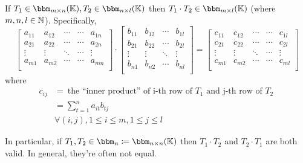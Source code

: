 \begin{definition} 
    If \(T_1 \in \bbm_{m\times n}(\bbk), T_2 \in \bbm_{n\times l}(\bbk)\) then \(T_1 \cdot T_2 \in \bbm_{m\times l}(\bbk)\) (where \(m, n, l \in \mathbb{N}\)). Specifically, \[
        \left[
            \begin{array}{ccccc}
                a_{11} & a_{12} & \cdots & \cdots & a_{1n} \\
                a_{21} & a_{22} & \cdots & \cdots & a_{2n} \\
                \vdots & \vdots & \ddots & \cdots & \vdots \\
                a_{m1} & a_{m2} & \cdots & \cdots & a_{mn} \\
            \end{array}
            \right] \cdot
        \left[
            \begin{array}{cccc}
                b_{11} & b_{12} & \cdots & b_{1l} \\
                b_{21} & b_{22} & \cdots & b_{2l} \\
                \vdots & \vdots & \ddots & \vdots \\
                b_{n1} & b_{n2} & \cdots & b_{nl} \\
            \end{array}
            \right] =
        \left[
            \begin{array}{ccccc}
                c_{11} & c_{12} & \cdots & \cdots & c_{1l} \\
                c_{21} & c_{22} & \cdots & \cdots & c_{2l} \\
                \vdots & \vdots & \ddots & \cdots & \vdots \\
                c_{m1} & c_{m2} & \cdots & \cdots & c_{ml} \\
            \end{array}
            \right]
    \]
    where
    \begin{align*}
        c_{ij} & = \:\text{the ``inner product'' of i-th row of \(T_1\) and j-th row of \(T_2\)}\: \\
               & = \sum_{t=1}^n a_{it}b_{tj}                                                       \\
               & \forall (i, j), 1 \leq i \leq m, 1 \leq j \leq l
    \end{align*}
\end{definition}

In particular, if \(T_1, T_2 \in \bbm_n \coloneqq \bbm_{n\times n}(\bbk) \) then \(T_1 \cdot T_2\) and \(T_2 \cdot T_1\) are both valid. In general, they're often not equal.

